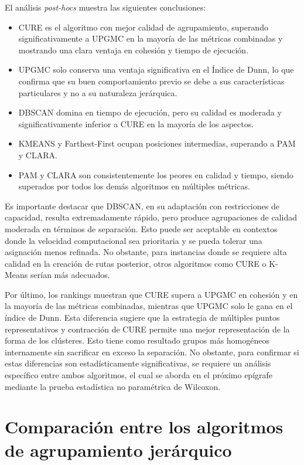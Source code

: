 El an\'alisis \textit{post-hocs} muestra las siguientes conclusiones:

\begin{itemize}
  \item CURE es el algoritmo con mejor calidad de agrupamiento, superando significativamente a UPGMC en la mayor\'ia de las m\'etricas combinadas y mostrando una clara ventaja en cohesi\'on y tiempo de ejecuci\'on.
  \item UPGMC solo conserva una ventaja significativa en el \'Indice de Dunn, lo que confirma que su buen comportamiento previo se debe a sus caracter\'isticas particulares y no a su naturaleza jer\'arquica.
  \item DBSCAN domina en tiempo de ejecuci\'on, pero su calidad es moderada y significativamente inferior a CURE en la mayor\'ia de los aspectos.
  \item KMEANS y Farthest-First ocupan posiciones intermedias, superando a PAM y CLARA.
  \item PAM y CLARA son consistentemente los peores en calidad y tiempo, siendo superados por todos los dem\'as algoritmos en m\'ultiples m\'etricas.
\end{itemize}

Es importante destacar que DBSCAN, en su adaptaci\'on con restricciones de capacidad, resulta extremadamente r\'apido, pero produce agrupaciones de calidad moderada en t\'erminos de separaci\'on. Esto puede ser aceptable en contextos donde la velocidad computacional sea prioritaria y se pueda tolerar una asignaci\'on menos refinada. No obstante, para instancias donde se requiere alta calidad en la creaci\'on de rutas posterior, otros algoritmos como CURE o K-Means ser\'ian m\'as adecuados.

Por \'ultimo, los rankings muestran que CURE supera a UPGMC en cohesi\'on y en la mayor\'ia de las m\'etricas combinadas, mientras que UPGMC solo le gana en el \'indice de Dunn. Esta diferencia sugiere que la estrategia de m\'ultiples puntos representativos y contracci\'on de CURE permite una mejor representaci\'on de la forma de los cl\'usteres. Esto tiene como resultado grupos m\'as homog\'eneos internamente sin sacrificar en exceso la separaci\'on. No obstante, para confirmar si estas diferencias son estad\'isticamente significativas, se requiere un an\'alisis espec\'ifico entre ambos algoritmos, el cual se aborda en el pr\'oximo ep\'igrafe mediante la prueba estad\'istica no param\'etrica de Wilcoxon.

\section{Comparaci\'on entre los algoritmos de agrupamiento jer\'arquico}

